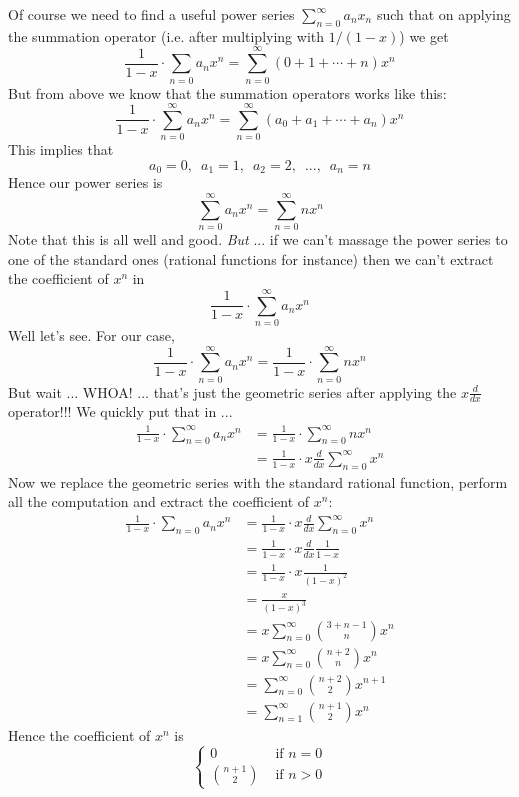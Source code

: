 Of course we need to find a useful power series $\sum_{n=0}^\infty a_nx_n$
such that on applying the summation operator (i.e. after multiplying with 
$1/(1-x)$) we get
\[
\frac{1}{1 - x} \cdot
\sum_{n=0}a_nx^n 
=
\sum_{n=0}^\infty (0 + 1 + \cdots + n) x^n
\]
But from above we know that the summation operators works like this:
\[
\frac{1}{1 - x} \cdot
\sum_{n=0}^\infty a_nx^n 
= \sum_{n=0}^\infty (a_0 + a_1 + \cdots + a_n) x^n
\]
This implies that
\[
a_0 = 0, \,\,\, a_1=1, \,\,\, a_2=2, \,\,\, ..., \,\,\, a_n=n
\]
Hence our power series is
\[
\sum_{n=0}^\infty a_n x^n = \sum_{n=0}^\infty nx^n
\]
Note that this is all well and good.
\textit{But} ... if we can't massage the power series to one of the standard
ones (rational functions for instance) then we can't extract the coefficient
of $x^n$ in 
\[
\frac{1}{1 - x} \cdot
\sum_{n=0}^\infty a_nx^n 
\]
Well let's see.
For our case,
\[
\frac{1}{1 - x} \cdot
\sum_{n=0}^\infty a_nx^n 
= \frac{1}{1-x} \cdot \sum_{n=0}^\infty n x^n
\]
But wait ... WHOA! ... that's just the geometric series after applying the
$\displaystyle x \frac{d}{dx}$ operator!!!
We quickly put that in ...
\begin{align*}
\frac{1}{1 - x} \cdot
\sum_{n=0}^\infty a_nx^n 
&= \frac{1}{1-x} \cdot \sum_{n=0}^\infty n x^n \\
&= \frac{1}{1-x} \cdot x \frac{d}{dx} \sum_{n=0}^\infty x^n
\end{align*}
Now we replace the geometric series with the standard rational
function, perform all the computation and extract the coefficient of $x^n$:
\begin{align*}
\frac{1}{1 - x} \cdot
\sum_{n=0}a_nx^n 
&= \frac{1}{1-x} \cdot x \frac{d}{dx} \sum_{n=0}^\infty x^n \\
&= \frac{1}{1-x} \cdot x \frac{d}{dx} \frac{1}{1-x} \\
&= \frac{1}{1-x} \cdot x \frac{1}{(1-x)^2} \\
&= \frac{x}{(1-x)^3} \\
&= x \sum_{n=0}^\infty \binom{3 + n - 1}{n} x^n \\
&= x \sum_{n=0}^\infty \binom{n + 2}{n} x^n \\
&= \sum_{n=0}^\infty \binom{n + 2}{2} x^{n+1} \\
&= \sum_{n=1}^\infty \binom{n + 1}{2} x^{n}
\end{align*}
Hence the coefficient of $x^n$ is
\[
\begin{cases}
0 & \text{ if $n = 0$} \\
\binom{n+1}{2}  & \text{ if $n > 0$}
\end{cases}
\]
